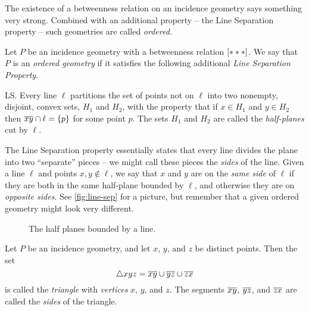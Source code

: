 The existence of a betweenness relation on an incidence geometry says something very strong.
Combined with an additional property -- the Line Separation property -- such geometries are called \emph{ordered}.

\begin{dfn}
Let \(P\) be an incidence geometry with a betweenness relation \([ \ast \ast \ast ]\).
We say that \(P\) is an \emph{ordered geometry} if it satisfies the following additional \emph{Line Separation Property}.
\begin{proplist}
\item[LS.] Every line \(\ell\) partitions the set of points not on \(\ell\) into two nonempty, disjoint, convex sets, \(H_1\) and \(H_2\), with the property that if \(x \in H_1\) and \(y \in H_2\) then \(\overline{xy} \cap \ell = \{p\}\) for some point \(p\).
The sets \(H_1\) and \(H_2\) are called the \emph{half-planes} cut by \(\ell\).
\end{proplist}
\end{dfn}

The Line Separation property essentially states that every line divides the plane into two ``separate'' pieces -- we might call these pieces the \emph{sides} of the line.
Given a line \(\ell\) and points \(x,y \notin \ell\), we say that \(x\) and \(y\) are on the \emph{same side} of \(\ell\) if they are both in the same half-plane bounded by \(\ell\), and otherwise they are on \emph{opposite sides}.
See \autoref{fig:line-sep} for a picture, but remember that a given ordered geometry might look very different.

\begin{figure}[h]
\begin{center}
\caption{\label{fig:line-sep}The half planes bounded by a line.}
\end{center}
\end{figure}

\begin{dfn}[Triangle]
Let \(P\) be an incidence geometry, and let \(x\), \(y\), and \(z\) be distinct points.
Then the set \[ \bigtriangleup{xyz} = \overline{xy} \cup \overline{yz} \cup \overline{zx} \] is called the \emph{triangle} with \emph{vertices} \(x\), \(y\), and \(z\).
The segments \(\overline{xy}\), \(\overline{yz}\), and \(\overline{zx}\) are called the \emph{sides} of the triangle.
\end{dfn}

